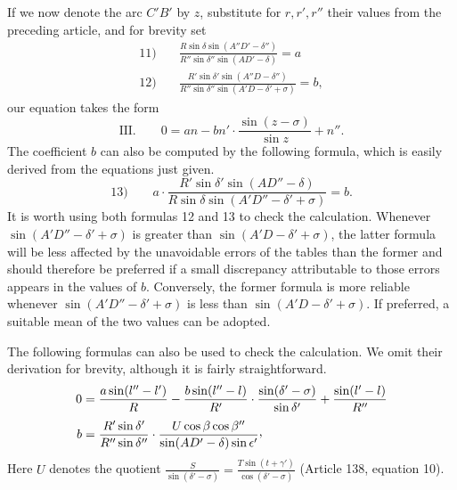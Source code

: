 If we now denote the arc $C'B'$ by $z$, substitute for $r,r',r''$ their values from the preceding article, and for brevity set
\[
\begin{aligned}
11)\quad&\frac{R\sin\delta\sin(A''D'-\delta'')}{R''\sin\delta''\sin(AD'-\delta)}=a\\[.8ex]
12)\quad&\frac{R'\sin\delta'\sin(A''D-\delta'')}{R''\sin\delta''\sin(A'D-\delta'+\sigma)}=b,
\end{aligned}
\]
our equation takes the form
\[
\text{III.}\qquad 0=an-bn'\cdot\frac{\sin(z-\sigma)}{\sin z}+n''.
\]
The coefficient $b$ can also be computed by the following formula, which is easily derived from the equations just given.
\[
13)\qquad a\cdot\frac{R'\sin\delta'\sin(AD''-\delta)}{R\sin\delta\sin(A'D''-\delta'+\sigma)}=b.
\]
It is worth using both formulas 12 and 13 to check the calculation.
\hypertarget{native-189}{}Whenever $\sin(A'D''-\delta'+\sigma)$ is greater than $\sin(A'D-\delta'+\sigma)$, the latter formula will be less affected by the unavoidable errors of the tables than the former and should therefore be preferred if a small discrepancy attributable to those errors appears in the values of $b$. Conversely, the former formula is more reliable whenever $\sin(A'D''-\delta'+\sigma)$ is less than $\sin(A'D-\delta'+\sigma)$. If preferred, a suitable mean of the two values can be adopted.

The following formulas can also be used to check the calculation. We omit their derivation for brevity, although it is fairly straightforward.
\[
\begin{aligned}
0&=\frac{a\sin(l''-l')}{R}-\frac{b\sin(l''-l)}{R'}\cdot\frac{\sin(\delta'-\sigma)}{\sin\delta'}+\frac{\sin(l'-l)}{R''}\\[.8ex]
b&=\frac{R'\sin\delta'}{R''\sin\delta''}\cdot\frac{U\cos\beta\cos\beta''}{\sin(AD'-\delta)\sin\epsilon'}\mathpunct{\raisebox{.45ex}{,}}
\end{aligned}
\]
Here $U$ denotes the quotient $\frac{S}{\sin(\delta'-\sigma)}=\frac{T\sin(t+\gamma')}{\cos(\delta'-\sigma)}$ (Article 138, equation 10).
